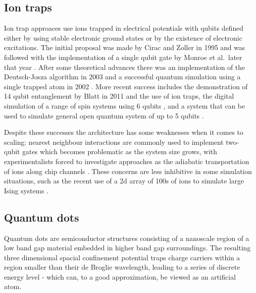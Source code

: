 \subsection{Ion traps}

Ion trap approaces use ions trapped in electrical potentials with qubits defined either by using stable electronic ground states or by the existence of electronic excitations. The initial proposal was made by Cirac and Zoller in 1995 \cite{cirac_zoller_ion_trap_proposal_95} and was followed with the implementation of a single qubit gate by Monroe et al.\ later that year \cite{monroe_ion_trap_gate_95}. After some theoretical advances  \cite{first_ion_trap_wineland_98} there was an implementation of the Deutsch-Josza algorithm in 2003 \cite{ion_trap_deutsch_jozsa_03} and a successful quantum simulation using a single trapped atom in 2002 \cite{ion_trap_simulator_02}. More recent success includes the demonstration of 14 qubit entanglement by Blatt in 2011 \cite{ion_trap_14_qubits} and the use of ion traps, the digital simulation of a range of spin systems using 6 qubits \cite{ion_trap_digital_simulator}, and a system that can be used to simulate general open quantum system of up to 5 qubits \cite{ion_trap_simulator}.

Despite these successes the architecture has some weaknesses when it comes to scaling: nearest neighbour interactions are commonly used to implement two-qubit gates which becomes problematic as the system size grows, with experimentalists forced to investigate approaches as the adiabatic transportation of ions along chip channels \cite{ion_trap_on_chip}. These concerns are less inhibitive in some simulation situations, such as the recent use of a 2d array of 100s of ions to simulate large Ising systems \cite{ion_trap_magnetism_simulator}.

\subsection{Quantum dots}

Quantum dots are semiconductor structures consisting of a nanoscale region of a low band gap material embedded in higher band gap surroundings. The resulting three dimensional spacial confinement potential traps charge carriers within a region smaller than their de Broglie wavelength, leading to a series of discrete energy level - which can, to a good approximation, be viewed as an artificial atom.

